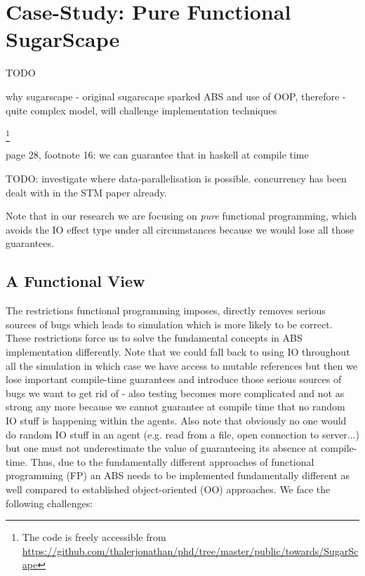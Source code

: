 \section{Case-Study: Pure Functional SugarScape}
\label{sec:case_study}

TODO

why sugarscape
- original sugarscape sparked ABS and use of OOP, therefore 
- quite complex model, will challenge implementation techniques

\footnote{The code is freely accessible from \url{https://github.com/thalerjonathan/phd/tree/master/public/towards/SugarScape}}

\cite{weaver_replicating_nodate}

page 28, footnote 16: we can guarantee that in haskell at compile time

TODO: investigate where data-parallelisation is possible. concurrency has been dealt with in the STM paper already.

Note that in our research we are focusing on \textit{pure} functional programming, which avoids the IO effect type under all circumstances because we would lose all those guarantees.

\subsection{A Functional View}
The restrictions functional programming imposes, directly removes serious sources of bugs which leads to simulation which is more likely to be correct. These restrictions force us to solve the fundamental concepts in ABS implementation differently. Note that we could fall back to using IO throughout all the simulation in which case we have access to mutable references but then we lose important compile-time guarantees and introduce those serious sources of bugs we want to get rid of - also testing becomes more complicated and not as strong any more because we cannot guarantee at compile time that no random IO stuff is happening within the agents. Also note that obviously no one would do random IO stuff in an agent (e.g. read from a file, open connection to server...) but one must not underestimate the value of guaranteeing its absence at compile-time. Thus, due to the fundamentally different approaches of functional programming (FP) an ABS needs to be implemented fundamentally different as well compared to established object-oriented (OO) approaches. We face the following challenges:

